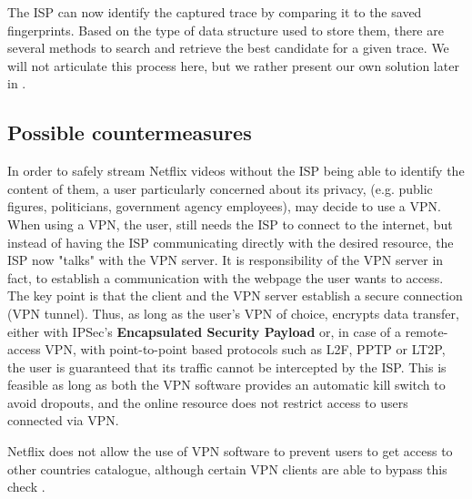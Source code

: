 The ISP can now identify the captured trace by comparing it to the saved
fingerprints.  Based on the type of data structure used to store them, there
are several methods to search and retrieve the best candidate for a given
trace. We will not articulate this process here, but we rather present our own
solution later in .

\subsection{Possible countermeasures}\label{sec:vpn}

In order to safely stream Netflix videos without the ISP being able to identify
the content of them, a user particularly concerned about its privacy, (e.g.
public figures, politicians, government agency employees), may decide to use a
VPN. When using a VPN, the user, still needs the ISP to connect to the
internet, but instead of having the ISP communicating directly with the desired
resource, the ISP now "talks" with the VPN server. It is responsibility of the
VPN server in fact, to establish a communication with the webpage the user
wants to access.  The key point is that the client and the VPN server establish
a secure connection (VPN tunnel). Thus, as long as the user's VPN of choice,
encrypts data transfer, either with IPSec's \textbf{Encapsulated Security
Payload} or, in case of a remote-access VPN, with point-to-point based
protocols such as L2F, PPTP or LT2P, the user is guaranteed that its traffic
cannot be intercepted by the ISP. This is feasible as long as both the VPN
software provides an automatic kill switch to avoid dropouts, and the online
resource does not restrict access to users connected via VPN. 

Netflix does not allow the use of VPN software to prevent users to get access
to other countries catalogue, although certain VPN clients are able to bypass
this check \cite{nordvpn}.
